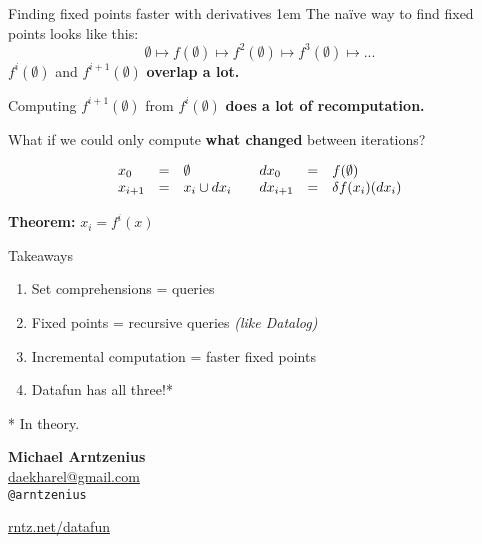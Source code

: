 \documentclass[xcolor=table,usenames,dvipsnames,svgnames]{beamer}
\begin{document}

\begin{frame}{Finding fixed points faster with derivatives}
  \large \parskip 1em
  The na\"ive way to find fixed points looks like this:
  $${\emptyset \mapsto f(\emptyset) \mapsto f^2(\emptyset) \mapsto f^3(\emptyset) \mapsto ...}$$
  \pause
  $f^i(\emptyset)$ and $f^{i+1}(\emptyset)$ \textbf{overlap a lot.}

  Computing $f^{i+1}(\emptyset)$ from $f^i(\emptyset)$ \textbf{does a lot of recomputation.}

  \pause
  What if we could only compute \textbf{what changed} between iterations?
\end{frame}

\begin{frame}\Large
  $$\begin{array}{lcl@{\hspace{2em}}lcl}
    x_0 &=& \emptyset
    & dx_0 &=& f(\emptyset)\\
    x_{i+1} &=& x_i \cup dx_i
    & dx_{i+1} &=& \delta f (x_i)(dx_i)\\
  \end{array}$$

  \vspace{1em}
  \textbf{Theorem:} $x_i = f^i(x)$
\end{frame}


\begin{frame}{Takeaways}\large
  \begin{enumerate}\itemsep 1em
  \item Set comprehensions = queries
  \item Fixed points = recursive queries {\it\small (like Datalog)}
  \item Incremental computation = faster fixed points
  \item Datafun has all three!*
  \end{enumerate}

  \vspace{1em}\small
  * In theory.
\end{frame}

\begin{frame}\Large
  \textbf{Michael Arntzenius}\\
  \href{mailto:daekharel@gmail.com}{daekharel@gmail.com}\\
  \texttt{@arntzenius}

  \vspace{1em}
  \centering \huge \url{rntz.net/datafun}
\end{frame}
\end{document}

